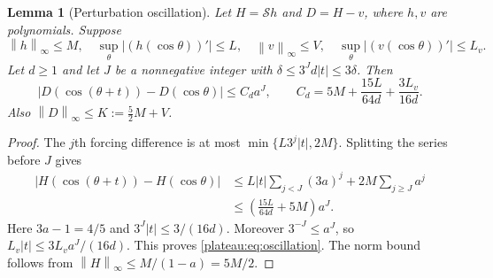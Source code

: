 \documentclass[11pt]{article}
\newtheorem{lemma}[theorem]{Lemma}
\theoremstyle{remark}\newtheorem{remark}[theorem]{Remark}
\newcommand{\norm}[1]{\left\lVert #1\right\rVert_\infty}
\begin{document}
\begin{lemma}[Perturbation oscillation]\label{plateau:lem:oscillation}
Let $H=\mathcal S h$ and $D=H-v$, where $h,v$ are polynomials. Suppose
\[
 \norm h\le M,\quad
 \sup_\theta|(h(\cos\theta))'|\le L,\quad
 \norm v\le V,\quad
 \sup_\theta|(v(\cos\theta))'|\le L_v.
\]
Let $d\ge1$ and let $J$ be a nonnegative integer with
$\delta\le3^Jd|t|\le3\delta$. Then
\begin{equation}\label{plateau:eq:oscillation}
 |D(\cos(\theta+t))-D(\cos\theta)|\le C_d a^J,
 \qquad
 C_d=5M+\frac{15L}{64d}+\frac{3L_v}{16d}.
\end{equation}
Also $\norm D\le K:=\frac52M+V$.
\end{lemma}
\begin{proof}
The $j$th forcing difference is at most
$\min\{L3^j|t|,2M\}$. Splitting the series before $J$ gives
\begin{align*}
 |H(\cos(\theta+t))-H(\cos\theta)|
 &\le L|t|\sum_{j<J}(3a)^j+2M\sum_{j\ge J}a^j\\
 &\le\left(\frac{15L}{64d}+5M\right)a^J.
\end{align*}
Here $3a-1=4/5$ and $3^J|t|\le3/(16d)$.
Moreover $3^{-J}\le a^J$, so
$L_v|t|\le3L_va^J/(16d)$. This proves \eqref{plateau:eq:oscillation}.
The norm bound follows from $\norm H\le M/(1-a)=5M/2$.
\end{proof}
\end{document}
